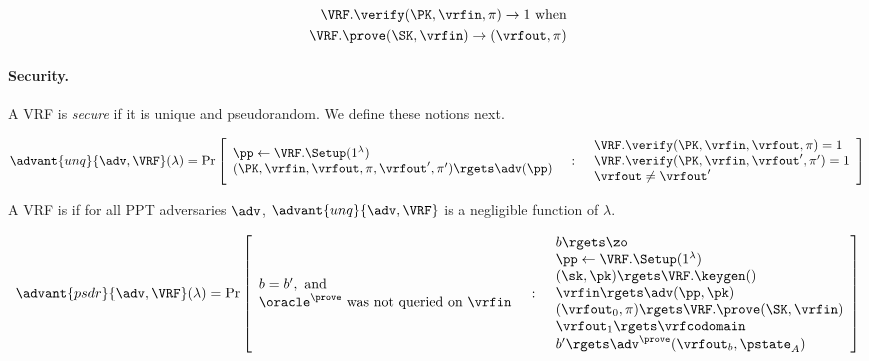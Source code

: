 \begin{align} \label{eq:vrf-correct}
  \begin{split}
    \VRF.\verify(\PK, \vrfin, \pi) \rightarrow 1 \text{ when} \\
    \VRF.\prove(\SK, \vrfin) \rightarrow (\vrfout, \pi)
  \end{split}
\end{align}

\paragraph{Security.}
A VRF is \emph{secure} if it is unique and pseudorandom.
We define these notions next.

\[
  \advant{unq}{\adv,\VRF}(\lambda)
     = \Pr\left[
            \begin{array}{l}
                \pp \gets \VRF.\Setup(1^\lambda) \\
               (\PK, \vrfin,\vrfout, \pi, \vrfout', \pi') \rgets \adv(\pp)
            \end{array}
            \ \ :\ \
            \begin{array}{l}
                \VRF.\verify(\PK, \vrfin, \vrfout, \pi) = 1 \\
                \VRF.\verify(\PK, \vrfin, \vrfout', \pi') = 1 \\
                \vrfout \neq \vrfout'
            \end{array}
        \right]
\]

\begin{definition}
  A VRF is  if for all PPT adversaries $\adv$,
  $\advant{unq}{\adv,\VRF}$ is a negligible function of $\lambda$.
\end{definition}


\[
  \advant{psdr}{\adv,\VRF}(\lambda)
     = \Pr\left[
            \begin{array}{l}
              b = b', \text{ and} \\
              \oracle^{\prove} \text{ was not queried on } \vrfin
            \end{array}
            \ \ :\ \
            \begin{array}{l}
                b \rgets \zo \\
                \pp \gets \VRF.\Setup(1^\lambda) \\
                (\sk, \pk) \rgets \VRF.\keygen() \\
                \vrfin \rgets \adv(\pp, \pk) \\
                (\vrfout_0, \pi) \rgets \VRF.\prove(\SK, \vrfin) \\
                \vrfout_1 \rgets \vrfcodomain \\
                b' \rgets \adv^{\prove}(\vrfout_b, \pstate_A)
            \end{array}
        \right]
\]

